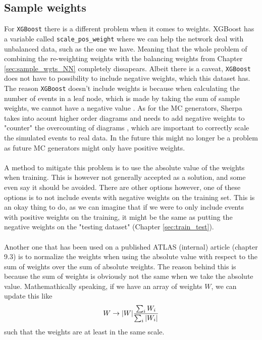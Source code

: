 \documentclass[12pt, a4paper]{book}
\begin{document}
\subsection{Sample weights}
For \verb|XGBoost| there is a different problem when it comes to weights. XGBoost has a variable called \verb|scale_pos_weight| where we can help the network deal with unbalanced data, such as the one we have. 
Meaning that the whole problem of combining the re-weighting weights with the balancing weights from Chapter \ref{sec:sample_wgts_NN} completely dissapears. Albeit there is a caveat, \verb|XGBoost| does not have to possibility to include negative weights, which this dataset has. The reason \verb|XGBoost| 
doesn't include weights is because when calculating the number of events in a leaf node, which is made by taking the sum of sample weights, we cannot have a negative value \cite{neg_wgt_xbg1, neg_wgt_xbg2}.
As for the MC generators, Sherpa \cite{Sherpa} takes into acount higher order diagrams and needs to add negative weights to "counter" the overcounting of diagrams \cite{Negative_Weights_article}, which are important to correctly scale the simulated events to real data.
In the future this might no longer be a problem as  future MC generators might only have positive weights.\\
\\A method to mitigate this problem is to use the absolute value of the weights when training. This is however not generally accepted as a solution, and some even say it should be avoided. There are other options however, one of these options is to not include events with negative weights on the training set. 
This is an okay thing to do, as we can imagine that if we were to only include events with positive weights on the training, it might be the same as putting the negative weights on the "testing dataset" (Chapter \ref{sec:train_test}). \\
\\Another one that has been used on a published ATLAS (internal) article (chapter 9.3) \cite{Abbott:2714377} is to normalize the weights when using the absolute value with respect to the sum of weights over the sum of absolute weights. The reason behind this is because the sum of weights is obviously not the same when we take the absolute value. 
Mathemathically speaking, if we have an array of weights $W$, we can update this like
\begin{equation}\label{eq:ATLAS_wgt}
   W \rightarrow \abs{W}\frac{\sum_i W_i}{\sum_i\abs{W_i}}
\end{equation}
such that the weights are at least in the same scale. 
\end{document}
